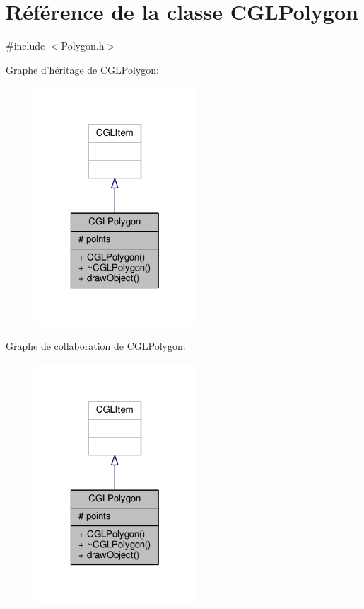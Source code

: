 \hypertarget{class_c_g_l_polygon}{\section{Référence de la classe C\-G\-L\-Polygon}
\label{class_c_g_l_polygon}
}


{\ttfamily \#include $<$Polygon.\-h$>$}



Graphe d'héritage de C\-G\-L\-Polygon\-:
\nopagebreak
\begin{figure}[H]
\begin{center}
\leavevmode
\includegraphics[width=172pt]{d9/d48/class_c_g_l_polygon__inherit__graph}
\end{center}
\end{figure}


Graphe de collaboration de C\-G\-L\-Polygon\-:
\nopagebreak
\begin{figure}[H]
\begin{center}
\leavevmode
\includegraphics[width=172pt]{d0/d36/class_c_g_l_polygon__coll__graph}
\end{center}
\end{figure}
